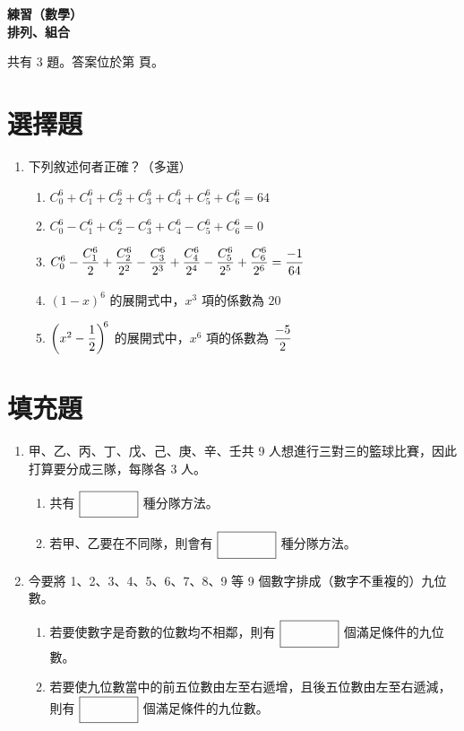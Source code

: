 \documentclass[10pt]{article}
\newcommand*{\blank}[1]{\rule[-.7\baselineskip]{0pt}{1.8\baselineskip}\fbox{\rule[-.4\baselineskip]{0pt}{1.2\baselineskip}\hspace{#1}}}
\newcommand*{\fraction}[2]{\rule[-.8\baselineskip]{0pt}{2\baselineskip}\dfrac{#1}{#2}}
\renewcommand*{\maketitle}{{%
  \bfseries
  \LARGE 練習（數學） \\
  \large 排列、組合 \par
}}
\begin{document}
\maketitle
\medskip
共有 3 題。答案位於第 \pageref{answer} 頁。
\section{選擇題}
\begin{enumerate}[label=\arabic*.,align=left,leftmargin=*,labelsep=.3em]
  \item 下列敘述何者正確？（多選）
  \begin{enumerate}[label=(\Alph*),align=left,leftmargin=*,labelsep=.3em]
    \item $C^6_0 + C^6_1 + C^6_2 + C^6_3 + C^6_4 + C^6_5 + C^6_6 = 64$
    \item $C^6_0 - C^6_1 + C^6_2 - C^6_3 + C^6_4 - C^6_5 + C^6_6 = 0$
    \item $C^6_0 - \fraction{C^6_1}{2} + \fraction{C^6_2}{2^2} - \fraction{C^6_3}{2^3} + \fraction{C^6_4}{2^4} - \fraction{C^6_5}{2^5} + \fraction{C^6_6}{2^6} = \fraction{-1}{64}$
    \item $(1-x)^6$ 的展開式中，$x^3$ 項的係數為 $20$
    \item $\biggl(x^2-\fraction{1}{2}\biggr)^{\mkern-4mu6}$ 的展開式中，$x^6$ 項的係數為 $\fraction{-5}{2}$
  \end{enumerate}
\end{enumerate}

\newpage

\section{填充題}
\begin{enumerate}[label=\arabic*.,align=left,leftmargin=*,labelsep=.3em,start=2]
  \item 甲、乙、丙、丁、戊、己、庚、辛、壬共 9 人想進行三對三的籃球比賽，因此打算要分成三隊，每隊各 3 人。
  \begin{enumerate}[label=(\arabic*),align=left,leftmargin=*,labelsep=.3em]
    \item 共有 $\blank{4em}$ 種分隊方法。
    \item 若甲、乙要在不同隊，則會有 $\blank{4em}$ 種分隊方法。
  \end{enumerate}
  \newpage
  \item 今要將 1、2、3、4、5、6、7、8、9 等 9 個數字排成（數字不重複的）九位數。
  \begin{enumerate}[label=(\arabic*),align=left,leftmargin=*,labelsep=.3em]
    \item 若要使數字是奇數的位數均不相鄰，則有 $\blank{4em}$ 個滿足條件的九位數。
    \item 若要使九位數當中的前五位數由左至右遞增，且後五位數由左至右遞減，則有 $\blank{4em}$ 個滿足條件的九位數。
  \end{enumerate}
\end{enumerate}
\end{document}
